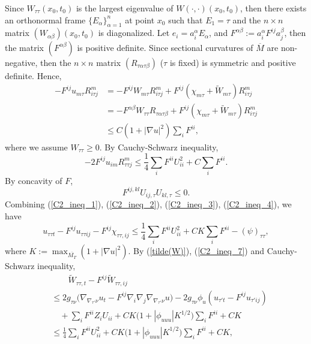 \documentclass[12pt]{amsart}
\theoremstyle{definition}
\theoremstyle{remark}
\numberwithin{equation}{section}
\begin{document}
Since $W_{\tau\tau} (x_0, t_0)$ is the largest eigenvalue of $W(\cdot, \cdot)(x_0, t_0)$, then there exists an orthonormal frame $\{ E_\alpha \}_{\alpha=1}^{n}$ at point $x_0$ such that $E_1 = \tau$ and the $n\times n$ matrix $(W_{\alpha\beta})(x_0, t_0)$ is diagonalized. Let $e_i = a^\alpha_i E_\alpha$, and $F^{\alpha\beta} := a^\alpha_i F^{ij} a^{\beta}_j$, then the matrix $(F^{\alpha\beta})$ is positive definite. Since sectional curvatures of $\overline{M}$ are non-negative, then the $n\times n$ matrix $(R_{\tau\alpha\tau\beta})$ ($\tau$ is fixed) is symmetric and positive definite. Hence,
\begin{equation}\label{C2_ineq_2}
\begin{aligned}
- F^{ij} u_{m\tau} R^m_{i\tau j} &= - F^{ij} W _{m\tau} R^m_{i\tau j} + F^{ij} (\chi_{m\tau} + \tilde{W}_{m\tau}) R^m_{i\tau j} \\
&= - F^{\alpha\beta} W_{\tau\tau} R_{\tau\alpha\tau\beta} + F^{ij} (\chi_{m\tau} + \tilde{W}_{m\tau}) R^m_{i\tau j}\\
& \leq  C (1 + |\nabla u|^2) \sum_i F^{ii},
\end{aligned}
\end{equation}
where we assume $W_{\tau\tau} \geq 0$.
By Cauchy-Schwarz inequality,
\begin{equation}\label{C2_ineq_3}
-2F^{ij} u_{im} R^m_{\tau\tau j} \leq \frac{1}{4} \sum_i F^{ii} U_{ii}^2 + C \sum_{i} F^{ii}.
\end{equation}
By concavity of $F$, 
\begin{equation}\label{C2_ineq_4}
F^{ij,kl} U_{ij,\tau} U_{kl,\tau}  \leq 0.
\end{equation}
Combining (\ref{C2_ineq_1}), (\ref{C2_ineq_2}), (\ref{C2_ineq_3}), (\ref{C2_ineq_4}), we have
\begin{equation}\label{C2_ineq_5}
u_{\tau\tau t} - F^{ij} u_{\tau\tau ij} - F^{ij} \chi_{\tau\tau, ij} \leq \frac{1}{4} \sum_i F^{ii} U_{ii}^2 + CK \sum_{i} F^{ii} - (\psi)_{\tau\tau},
\end{equation}
where $K := \max_{\overline{M_T}} (1 + |\nabla u|^2).$
By (\ref{tilde(W)}), (\ref{C2_ineq_7}) and Cauchy-Schwarz inequality, 
\begin{equation}\label{C2_ineq_6}
\begin{aligned}
& \qquad \tilde{W}_{\tau\tau, t} - F^{ij}\tilde{W}_{\tau\tau, ij} \\
& \leq 2 g_{\tau\nu} \Big(\nabla_{\nabla_{\tau'}\nu} u_t - F^{ij} \nabla_i \nabla_j \nabla_{\nabla_{\tau'}\nu} u\Big)
- 2 g_{\tau\nu} \phi_u (u_{\tau' t} - F^{ij} u_{\tau' ij})\\
& \quad + \sum_i F^{ii} Z_i U_{ii} + C K\Big(1 + |\phi_{uuu}| K^{1/2}\Big) \sum_i F^{ii} + CK \\
& \leq  \frac{1}{4} \sum_i F^{ii} U_{ii}^2 + C K\Big(1 + |\phi_{uuu}| K^{1/2}\Big) \sum_i F^{ii} + CK,
\end{aligned}
\end{equation}
\end{document}
